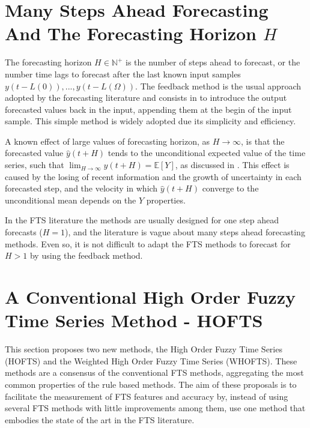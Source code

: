 %
\section{Many Steps Ahead Forecasting And The Forecasting Horizon $H$}
\label{sec:forecasting_horizon}

The forecasting horizon $H \in \mathbb{N}^+$ is the number of steps ahead to forecast, or the number time lags to forecast after the last known input samples $y(t - L(0)),..., y(t-L(\Omega))$.  The feedback method is the usual approach adopted by the forecasting literature and consists in to introduce the output forecasted values back in the input, appending them at the begin of the input sample. This simple method is widely adopted due its simplicity and efficiency.


A known effect of large values of forecasting horizon, as $H\rightarrow\infty$, is that the forecasted value $\hat{y}(t+H)$ tends to the unconditional expected value of the time series, such that $\lim_{H\rightarrow\infty} \hat{y}(t+H) = \mathbb{E}[Y]$, as discussed in \cite[p. 34]{Gourieroux2001FinancialMethods}. This effect is caused by the losing of recent information and the growth of uncertainty in each forecasted step, and the velocity in which $\hat{y}(t+H)$ converge to the unconditional mean depends on the $Y$ properties.

In the FTS literature the methods are usually designed for one step ahead forecasts ($H = 1$), and the literature is vague about many steps ahead forecasting methods. Even so, it is not difficult to adapt the FTS methods to forecast for $H > 1$ by using the feedback method.


%
\section{A Conventional High Order Fuzzy Time Series Method - HOFTS}
\label{sec:fts_hofts}

This section proposes two new methods, the High Order Fuzzy Time Series (HOFTS) and the Weighted High Order Fuzzy Time Series (WHOFTS). These methods are a consensus  of the conventional FTS methods, aggregating the most common properties of the rule based methods. The aim of these proposals is to facilitate the measurement of FTS features and accuracy by, instead of using several FTS methods with little improvements among them, use one method that embodies the state of the art in the FTS literature. 

